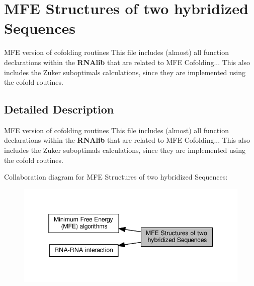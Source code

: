 \hypertarget{group__mfe__cofold}{}\section{M\+FE Structures of two hybridized Sequences}
\label{group__mfe__cofold}


M\+FE version of cofolding routines This file includes (almost) all function declarations within the {\bfseries R\+N\+Alib} that are related to M\+FE Cofolding... This also includes the Zuker suboptimals calculations, since they are implemented using the cofold routines.  




\subsection{Detailed Description}
M\+FE version of cofolding routines This file includes (almost) all function declarations within the {\bfseries R\+N\+Alib} that are related to M\+FE Cofolding... This also includes the Zuker suboptimals calculations, since they are implemented using the cofold routines. 

Collaboration diagram for M\+FE Structures of two hybridized Sequences\+:
\nopagebreak
\begin{figure}[H]
\begin{center}
\leavevmode
\includegraphics[width=345pt]{group__mfe__cofold}
\end{center}
\end{figure}
